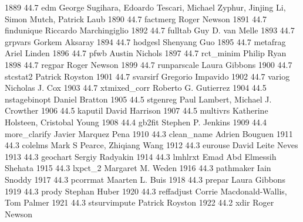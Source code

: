   1889     44.7    edm           George Sugihara, Edoardo Tescari,       
                                   Michael Zyphur, Jinjing Li, Simon       
                                   Mutch, Patrick Laub                     
  1890     44.7    factmerg      Roger Newson                            
  1891     44.7    findunique    Riccardo Marchingiglio                  
  1892     44.7    fulltab       Guy D. van Melle                        
  1893     44.7    grpvars       Gorkem Aksaray                          
  1894     44.7    hodgesl       Shenyang Guo                            
  1895     44.7    metafrag      Ariel Linden                            
  1896     44.7    pfwb          Austin Nichols                          
  1897     44.7    rct_minim     Philip Ryan                             
  1898     44.7    regpar        Roger Newson                            
  1899     44.7    runparscale   Laura Gibbons                           
  1900     44.7    stcstat2      Patrick Royston                         
  1901     44.7    svarsirf      Gregorio Impavido                       
  1902     44.7    variog        Nicholas J. Cox                         
  1903     44.7    xtmixed_corr  Roberto G. Gutierrez                    
  1904     44.5    nstagebinopt  Daniel Bratton                          
  1905     44.5    stgenreg      Paul Lambert, Michael J. Crowther       
  1906     44.5    kaputil       David Harrison                          
  1907     44.5    multivrs      Katherine Holsteen, Cristobal Young     
  1908     44.4    gb2fit        Stephen P. Jenkins                      
  1909     44.4    more_clarify  Javier Marquez Pena                     
  1910     44.3    clean_name    Adrien Bouguen                          
  1911     44.3    colelms       Mark S Pearce, Zhiqiang Wang            
  1912     44.3    eurouse       David Leite Neves                       
  1913     44.3    geochart      Sergiy Radyakin                         
  1914     44.3    lmhlrxt       Emad Abd Elmessih Shehata               
  1915     44.3    lxpct_2       Margaret M. Weden                       
  1916     44.3    pathmaker     Iain Snoddy                             
  1917     44.3    pcorrmat      Maarten L. Buis                         
  1918     44.3    prepar        Laura Gibbons                           
  1919     44.3    prody         Stephan Huber                           
  1920     44.3    reffadjust    Corrie Macdonald-Wallis, Tom Palmer     
  1921     44.3    stsurvimpute  Patrick Royston                         
  1922     44.2    xdir          Roger Newson                            

